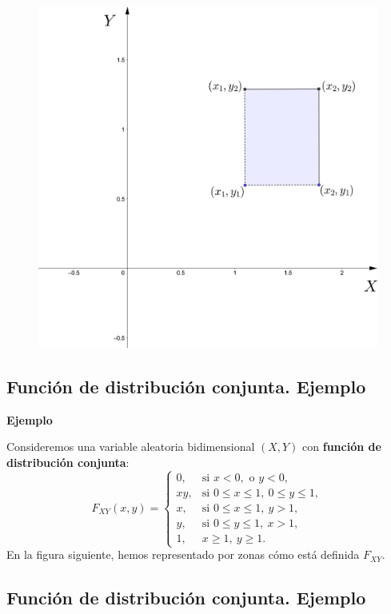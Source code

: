 \documentclass[]{book}
\begin{document}
\begin{figure}
\includegraphics[width=450px]{Images/Fxy3} \end{figure}

\hypertarget{funciuxf3n-de-distribuciuxf3n-conjunta.-ejemplo}{%
\subsection{Función de distribución conjunta. Ejemplo}\label{funciuxf3n-de-distribuciuxf3n-conjunta.-ejemplo}}

\textbf{Ejemplo}

Consideremos una variable aleatoria bidimensional \((X,Y)\) con \textbf{función de distribución conjunta}:
\[
F_{XY}(x,y)=\begin{cases}
0, & \mbox{si }x<0,\mbox{ o }y<0,\\
xy, & \mbox{si }0\leq x\leq 1,\ 0\leq y\leq 1, \\
x, & \mbox{si }0\leq x\leq 1,\ y> 1, \\
y, & \mbox{si }0\leq y\leq 1,\ x> 1, \\
1, & x\geq 1,\ y\geq 1.
\end{cases}
\]
En la figura siguiente, hemos representado por zonas cómo está definida \(F_{XY}\).

\hypertarget{funciuxf3n-de-distribuciuxf3n-conjunta.-ejemplo-1}{%
\subsection{Función de distribución conjunta. Ejemplo}\label{funciuxf3n-de-distribuciuxf3n-conjunta.-ejemplo-1}}
\end{document}
